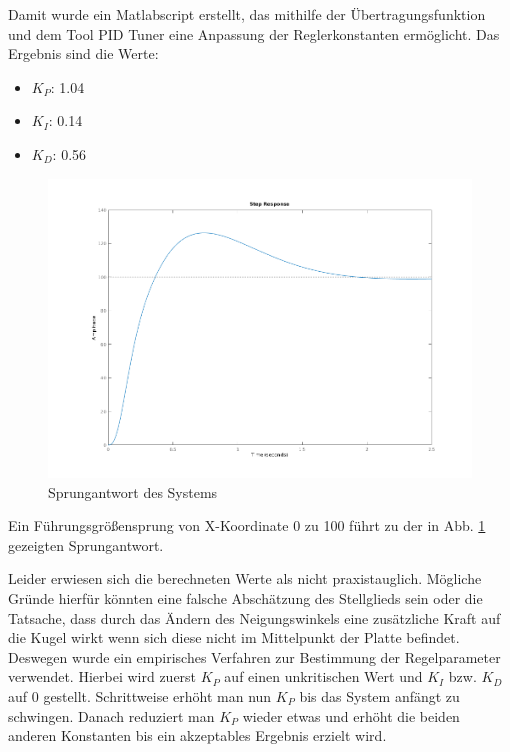 \documentclass[12pt,a4paper,bibliography=totoc,listof=totoc]{scrartcl}
\begin{document}
Damit wurde ein Matlabscript erstellt, das mithilfe der Übertragungsfunktion und dem Tool PID Tuner eine Anpassung der Reglerkonstanten ermöglicht. Das Ergebnis sind die Werte:

\begin{itemize}
\item \(K_P\): 1.04
\item \(K_I\): 0.14
\item \(K_D\): 0.56
\end{itemize} 

\begin{figure}[htbp]
	\centering
	\includegraphics[scale = 0.35]{pics/Sprung}
	\caption{Sprungantwort des Systems}
	\label{Sprung}
\end{figure}

Ein Führungsgrößensprung von X-Koordinate 0 zu 100 führt zu der in Abb. \ref{Sprung} gezeigten Sprungantwort.

Leider erwiesen sich die berechneten Werte als nicht praxistauglich. Mögliche Gründe hierfür könnten eine falsche Abschätzung des Stellglieds sein oder die Tatsache, dass durch das Ändern des Neigungswinkels eine zusätzliche Kraft auf die Kugel wirkt wenn sich diese nicht im Mittelpunkt der Platte befindet.\newline
Deswegen wurde ein empirisches Verfahren zur Bestimmung der Regelparameter verwendet. Hierbei wird zuerst \(K_P\) auf einen unkritischen Wert und \(K_I\) bzw. \(K_D\) auf 0 gestellt. Schrittweise erhöht man nun \(K_P\) bis das System anfängt zu schwingen. Danach reduziert man \(K_P\) wieder etwas und erhöht die beiden anderen Konstanten bis ein akzeptables Ergebnis erzielt wird. 
\end{document}

